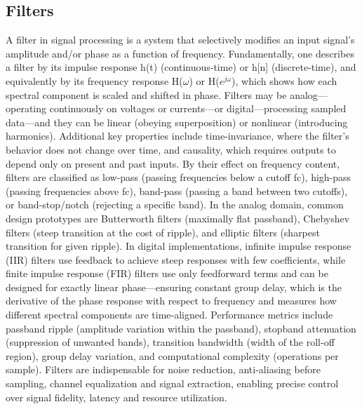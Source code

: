\subsection{Filters}
A filter in signal processing is a system that selectively modifies an input signal’s amplitude and/or phase as a function of frequency.  Fundamentally, one describes a filter by its impulse response h(t) (continuous‐time) or h[n] (discrete‐time), and equivalently by its frequency response H($\omega$) or H($e^{j\omega}$), which shows how each spectral component is scaled and shifted in phase.  Filters may be analog—operating continuously on voltages or currents—or digital—processing sampled data—and they can be linear (obeying superposition) or nonlinear (introducing harmonics).  Additional key properties include time-invariance, where the filter’s behavior does not change over time, and causality, which requires outputs to depend only on present and past inputs.  By their effect on frequency content, filters are classified as low-pass (passing frequencies below a cutoff fc), high-pass (passing frequencies above fc), band-pass (passing a band between two cutoffs), or band-stop/notch (rejecting a specific band).  In the analog domain, common design prototypes are Butterworth filters (maximally flat passband), Chebyshev filters (steep transition at the cost of ripple), and elliptic filters (sharpest transition for given ripple).  In digital implementations, infinite impulse response (IIR) filters use feedback to achieve steep responses with few coefficients, while finite impulse response (FIR) filters use only feedforward terms and can be designed for exactly linear phase—ensuring constant group delay, which is the derivative of the phase response with respect to frequency and measures how different spectral components are time-aligned.  Performance metrics include passband ripple (amplitude variation within the passband), stopband attenuation (suppression of unwanted bands), transition bandwidth (width of the roll-off region), group delay variation, and computational complexity (operations per sample).  Filters are indispensable for noise reduction, anti-aliasing before sampling, channel equalization and signal extraction, enabling precise control over signal fidelity, latency and resource utilization.

